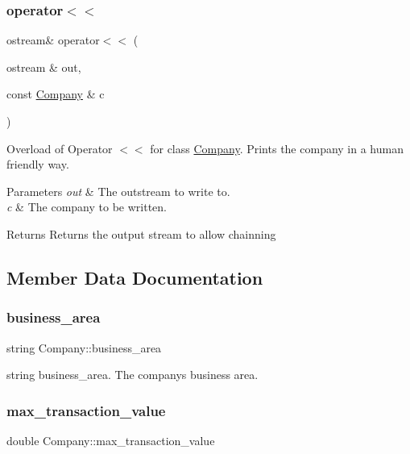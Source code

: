 \subsubsection{\texorpdfstring{operator$<$$<$}{operator<<}}
{\footnotesize\ttfamily ostream\& operator$<$$<$ (\begin{DoxyParamCaption}\item[{ostream \&}]{out,  }\item[{const \hyperlink{class_company}{Company} \&}]{c }\end{DoxyParamCaption})\hspace{0.3cm}{\ttfamily [friend]}}

Overload of Operator $<$$<$ for class \hyperlink{class_company}{Company}. Prints the company in a human friendly way. 
\begin{DoxyParams}{Parameters}
{\em out} & The outstream to write to. \\
\hline
{\em c} & The company to be written. \\
\hline
\end{DoxyParams}
\begin{DoxyReturn}{Returns}
Returns the output stream to allow chainning 
\end{DoxyReturn}


\subsection{Member Data Documentation}
\mbox{\label{class_company_ad67f44dc8c88152cb2f896b13a56fae5}} 
\subsubsection{\texorpdfstring{business\+\_\+area}{business\_area}}
{\footnotesize\ttfamily string Company\+::business\+\_\+area\hspace{0.3cm}{\ttfamily [private]}}

string business\+\_\+area. The company\textquotesingle{}s business area. \mbox{\label{class_company_a41137e8ae797c21fc22ea97ef8c3a4fb}} 
\subsubsection{\texorpdfstring{max\+\_\+transaction\+\_\+value}{max\_transaction\_value}}
{\footnotesize\ttfamily double Company\+::max\+\_\+transaction\+\_\+value\hspace{0.3cm}{\ttfamily [private]}}

